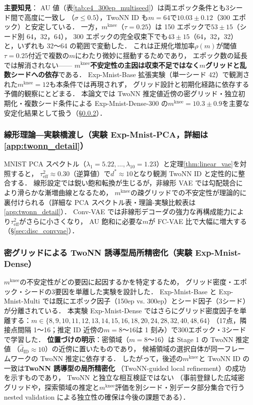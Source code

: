 \documentclass[11pt,a4paper]{jsarticle}
\newcommand{\mknee}{m^{\mathrm{knee}}}
\begin{document}
\textbf{主要知見}：
AU 値（表\ref{tab:e4_300ep_multiseed}）は両エポック条件とも3シード間で高度に一致し
（$\sigma \leq 0.5$），TwoNN ID も$m = 64$で$10.03 \pm 0.12$（300 エポック）と安定している．
一方，$\mknee$（$\tau=0.25$）は 150 エポックで$53 \pm 15$（シード別 64，32，64），
300 エポックの完全収束下でも$43 \pm 15$（64，32，32）と，いずれも 32〜64 の範囲で変動した．
これは正規化増加率$\rho(m)$が閾値$\tau = 0.25$付近で複数の$m$にわたり微妙に揺動するためであり，
エポック数の延長では解消されない——
\textbf{$\mknee$不安定性の主因は収束不足ではなく$m$グリッドと乱数シードへの依存}である．
Exp-Mnist-Base 拡張実験（単一シード 42）で観測された$\mknee = 12$も本条件では再現されず，
グリッド設計と初期化経路に依存する予備的観察にとどまる．
本論文では TwoNN 推定値近傍の密グリッド・独立初期化・複数シード条件による
Exp-Mnist-Dense-300 の$\mknee = 10.3 \pm 0.9$を主要な安定化結果として扱う（§\ref{sec:exp_el}）．

\subsubsection{線形理論―実験橋渡し（実験 Exp-Mnist-PCA，詳細は\ref{app:twonn_detail}）}\label{sec:exp_em}

MNIST PCA スペクトル（$\lambda_1=5.22, \ldots, \lambda_{10}=1.23$）と定理\ref{thm:linear_vae}を対照すると，
$\tau^2_\mathrm{eff} \approx 0.30$（逆算値）で$d^* \approx 10$となり観測 TwoNN ID と定性的に整合する．
線形設定では鋭い飽和転換が生じるが，非線形 VAE では勾配競合により滑らかな漸増曲線となるため，
$\mknee$の疎グリッドでの不安定性が理論的に裏付けられる（詳細な PCA スペクトル表・理論-実験比較表は\ref{app:twonn_detail}）．
Conv-VAE では非線形デコーダの強力な再構成能力により$\tau^2_\mathrm{eff}$がさらに小さくなり，
AU 飽和に必要な$m$が FC-VAE 比で大幅に増大する（§\ref{sec:disc_convvae}）．

\subsubsection{密グリッドによる TwoNN 誘導型局所精密化（実験 Exp-Mnist-Dense）}\label{sec:exp_el}

$\mknee$の不安定性がどの要因に起因するかを特定するため，
グリッド密度・エポック・シードの3要因を単離した実験を設計した．
Exp-Mnist-Base と Exp-Mnist-Multi では既にエポック因子（150ep vs. 300ep）とシード因子（3シード）が分離されている．
本実験 Exp-Mnist-Dense ではさらにグリッド密度因子を単離する：$m \in \{8,9,10,11,12,13,14,15,16,18,20,24,28,32,40,48,64\}$
（17点，隣接点間隔 1〜16；推定 ID 近傍の$m=8$〜$16$は 1 刻み）で300エポック・3シードで学習した．
\textbf{位置づけの明示}：密領域（$m = 8$〜16）は Stage 1 の TwoNN 推定値
（$\hat{d}_\mathrm{ID} \approx 10$）の近傍に置いたものであり，
候補領域の選択自体が同一フレームワークの TwoNN 推定に依存する．
したがって，後述の$\mknee$と TwoNN ID の一致は\textbf{TwoNN 誘導型の局所精密化}
（TwoNN-guided local refinement）の成功を示すものであり，
TwoNN と独立な相互検証ではない
（事前登録した広域密グリッドや，探索領域の推定と$\mknee$評価を別シード・別データ部分集合で行う
nested validation による独立性の確保は今後の課題である）．
\end{document}
